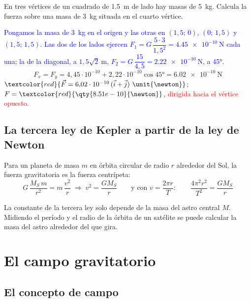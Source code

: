 \begin{exercise}
    En tres vértices de un cuadrado de \qty{1.5}{\m} de lado hay masas de \qty{5}{\kg}. Calcula la fuerza sobre una masa de
    \qty{3}{\kg} situada en el cuarto vértice.
    \begin{solu}
        \textcolor{blue}{Pongamos la masa de \qty{3}{\kg} en el origen y las otras en \((1{,}5;\,0)\), \((0;\,1{,}5)\) y
        \((1{,}5;\,1{,}5)\). Las dos de los lados ejercen \(F_1 = G\,\dfrac{5\cdot 3}{1{,}5^2} = \qty{4.45e-10}{\newton}\) cada una;
        la de la diagonal, a \(1{,}5\sqrt 2\ \unit{\m}\), \(F_2 = G\,\dfrac{15}{4{,}5} = \qty{2.22e-10}{\newton}\), a \ang{45}.}
        \[ F_x = F_y = 4{,}45\cdot 10^{-10} + 2{,}22\cdot 10^{-10}\cos\ang{45} = \qty{6.02e-10}{\newton} \]
        \(\textcolor{red}{\vec F = 6{,}02\cdot 10^{-10}\,(\vec{i} + \vec{j})\ \unit{\newton}}\); \(F = \textcolor{red}{\qty{8.51e-10}{\newton}}\),
        \textcolor{red}{dirigida hacia el vértice opuesto.}
    \end{solu}
\end{exercise}

\subsection{La tercera ley de Kepler a partir de la ley de Newton}\label{subsec:grav-kepler3}

Para un planeta de masa \(m\) en órbita circular de radio \(r\) alrededor del Sol, la fuerza gravitatoria es la fuerza
centrípeta:
\begin{equation*}
    G\,\dfrac{M_S\,m}{r^2} = m\,\dfrac{v^2}{r} \;\Rightarrow\; v^2 = \dfrac{G M_S}{r} \qquad\text{y con } v = \dfrac{2\pi r}{T}:\qquad
    \dfrac{4\pi^2 r^2}{T^2} = \dfrac{G M_S}{r}
\end{equation*}
\begin{centeredequation}
     \label{eq:grav-kepler3-newton}
\end{centeredequation}
La constante de la tercera ley solo depende de la masa del astro central \(M\). Midiendo el período y el radio de la órbita
de un satélite se puede calcular la masa del astro alrededor del que gira.

\section{El campo gravitatorio}\label{sec:grav-campo}

\subsection{El concepto de campo}\label{subsec:grav-concepto-campo}

